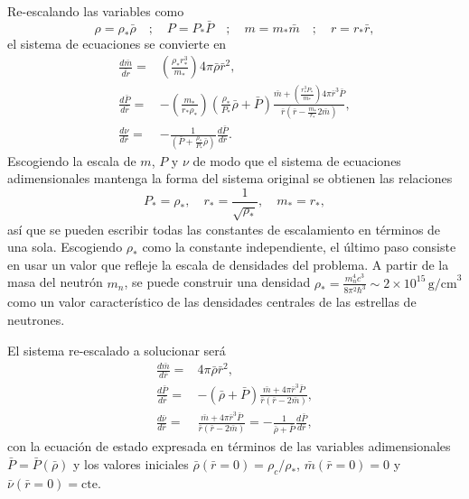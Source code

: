 Re-escalando las variables como
\begin{equation}
    \rho=\rho_* \bar{\rho} \quad ; \quad P=P_* \bar{P} \quad ; \quad m=m_*\bar{m} \quad ; \quad r=r_*\bar{r},
\end{equation}
el sistema de ecuaciones se convierte en
\begin{align}
\frac{d\bar{m}}{\bar{dr}}=&\left( \frac{\rho_* r_*^3}{m_*} \right) 4\pi \bar{\rho} \bar{r}^2 ,\\
\frac{d\bar{P}}{d\bar{r}}=&-\left( \frac{m_*}{r_* \rho_*} \right)\left(\frac{\rho_*}{P_*}\bar{\rho}+\bar{P}\right)\frac{\bar{m}+\left( \frac{r_*^3 P_*}{m_*} \right)4\pi \bar{r}^3 \bar{P}}{\bar{r}\left(\bar{r}-\frac{m_*}{r_*}2\bar{m}\right)} , \\
 \frac{d\nu}{d\bar{r}}=&-\frac{1}{\left(\bar{P}+\frac{\rho_*}{P_*}\bar{\rho}\right)}\frac{d\bar{P}}{d\bar{r}}.
\end{align}
Escogiendo la escala de $m$, $P$ y $\nu$ de modo que el sistema de ecuaciones adimensionales mantenga la forma del sistema original se obtienen las relaciones
\begin{equation}
    P_*=\rho_*,\quad r_*=\frac{1}{\sqrt{\rho_*}} ,\quad m_*=r_* ,
\end{equation}
así que se pueden escribir todas las constantes de escalamiento en términos de una sola.
Escogiendo $\rho_*$ como la constante independiente, el último paso consiste en usar un valor que refleje la escala de densidades del problema. A partir de la masa del neutrón $m_n$, se puede construir una densidad $\rho_* = \frac{m_{n}^{4}c^{3}}{8 \pi^2 \hbar^3}\sim 2\times 10^{15}\,\text{g/cm}^{3}$ como un valor característico de las densidades centrales de las estrellas de neutrones.

El sistema re-escalado a solucionar será
\begin{align}\label{adimensional}
      \frac{d\bar{m}}{d\bar{r}}=&4\pi \bar{\rho} \bar{r}^2 , \nonumber \\
    \frac{d\bar{P}}{d\bar{r}}=&-(\bar{\rho}+\bar{P})\frac{\bar{m}+4\pi \bar{r}^3 \bar{P}}{\bar{r}(\bar{r}-2\bar{m})} , \\
    \frac{d\bar{\nu}}{d\bar{r}}=& \frac{\bar{m}+4\pi \bar{r}^3 \bar{P}}{\bar{r}(\bar{r}-2\bar{m})} =  -\frac{1}{\bar{\rho}+\bar{P}}\frac{d\bar{P}}{d\bar{r}},\nonumber
\end{align}
con la ecuación de estado expresada en términos de las variables adimensionales $\bar{P}=\bar{P}(\bar{\rho})$ y los valores iniciales $\bar{\rho}(\bar{r}=0)=\rho_c / \rho_{*}$, $\bar{m}(\bar{r}=0)=0$ y $\bar{\nu}(\bar{r}=0)=\text{cte}$.

